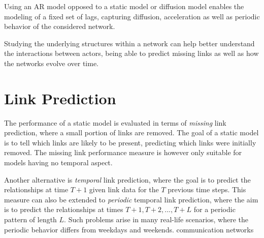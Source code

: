     Using an AR model opposed to a static model or diffusion model enables the modeling of a fixed set of lags, capturing diffusion, acceleration as well as periodic behavior of the considered network.
    
    Studying the underlying structures within a network can help better understand the interactions between actors, being able to predict missing links as well as how the networks evolve over time.

\section{Link Prediction}

    The performance of a static model is evaluated in terms of \emph{missing} link prediction, where a small portion of links are removed. The goal of a static model is to tell which links are likely to be present, predicting which links were initially removed. The missing link performance measure is however only suitable for models having no temporal aspect.
    
    Another alternative is \emph{temporal} link prediction, where the goal is to predict the relationships at time $T+1$ given link data for the $T$ previous time steps.
    This measure can also be extended to \emph{periodic} temporal link prediction, where the aim is to predict the relationships at times $T+1, T+2, ..., T+L$ for a periodic pattern of length $L$. Such problems arise in many real-life scenarios, where  the periodic behavior differs from weekdays and weekends.  communication networks 




    
